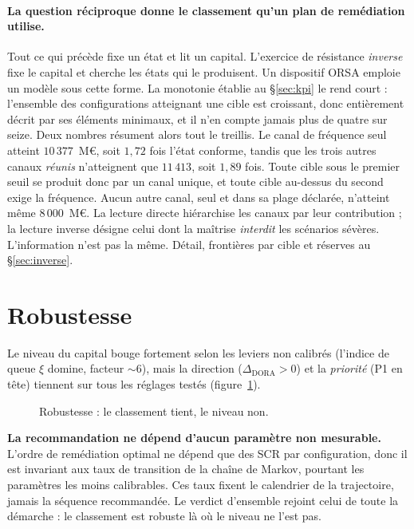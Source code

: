 \paragraph{La question réciproque donne le classement qu'un plan de
remédiation utilise.} Tout ce qui précède fixe un état et lit un capital. L'exercice de
résistance \emph{inverse} fixe le capital et cherche les états qui le produisent. Un dispositif ORSA emploie un modèle sous
cette forme. La monotonie établie au \S\ref{sec:kpi} le
rend court : l'ensemble des configurations atteignant une cible est croissant, donc entièrement
décrit par ses éléments minimaux, et il n'en compte jamais plus de quatre sur seize. Deux nombres
résument alors tout le treillis. Le canal de fréquence seul atteint $10\,377$~M\euro,
soit $1{,}72$ fois l'état conforme, tandis que les trois autres canaux \emph{réunis} n'atteignent
que $11\,413$, soit $1{,}89$ fois. Toute cible sous le premier seuil se produit donc par un canal
unique, et toute cible au-dessus du second exige la fréquence. Aucun autre canal, seul et
dans sa plage déclarée, n'atteint même $8\,000$~M\euro. La lecture directe hiérarchise les canaux
par leur contribution ; la lecture inverse désigne celui dont la maîtrise \emph{interdit} les
scénarios sévères. L'information n'est pas la même. Détail, frontières par cible et réserves
au \S\ref{sec:inverse}.

\section{Robustesse}
\label{sec:res-robustesse}

Le niveau du capital bouge fortement selon les leviers non calibrés (l'indice de queue $\xi$
domine, facteur $\sim 6$), mais la direction ($\Delta_{\text{DORA}}>0$) et la
\emph{priorité} (P1 en tête) tiennent sur tous les réglages testés (figure~\ref{fig:robust}).

\begin{figure}[htbp]\centering
{}
\caption{Robustesse : le classement tient, le niveau non.}
\label{fig:robust}
\end{figure}

\begin{cle}
\textbf{La recommandation ne dépend d'aucun paramètre non mesurable.} L'ordre de remédiation
optimal ne dépend que des SCR par configuration, donc il est invariant aux taux de
transition de la chaîne de Markov, pourtant les paramètres les moins calibrables. Ces taux
fixent le calendrier de la trajectoire, jamais la séquence recommandée. Le verdict d'ensemble
rejoint celui de toute la démarche : le classement est robuste là où le niveau ne l'est pas.
\end{cle}

